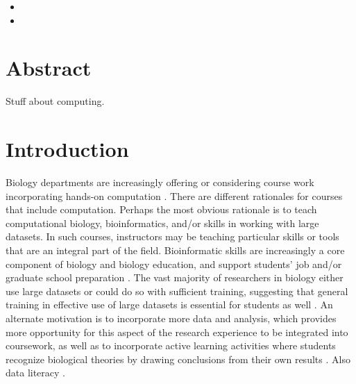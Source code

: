 \begin{itemize}
    \item {}   
    \item {}  
\end{itemize}


\section{Abstract}\label{sect:Abstract}

Stuff about computing.

\bigskip


\bigskip
\section{Introduction}\label{sect:Introduction}


Biology departments are increasingly offering or considering course work incorporating hands-on computation
\citep{WilsonSayres18}. 
There are different rationales for courses that include computation.
Perhaps the most obvious rationale is to teach computational biology, bioinformatics,
and/or skills in working with large datasets.
In such courses, instructors may be teaching particular skills or tools that are an integral part of the field.
Bioinformatic skills are increasingly a core component of biology and biology education, and 
support students' job and/or graduate school preparation \citep{WilsonSayres18}.
The vast majority of researchers in biology either use large datasets or could do so with sufficient training, suggesting that general training in effective use of large datasets is essential for students as well \citep{Barone17,Loman13}.
An alternate motivation is to incorporate more data and analysis,
which provides more opportunity for this aspect of the research experience to be
integrated into coursework, as well as to incorporate active learning activities where
students recognize biological theories by drawing conclusions from their own results
\citep{Kjelvik19}.
Also data literacy \citep{Gibson18}.

